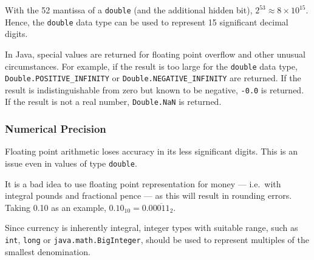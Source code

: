 With the \SI{52}{\bit} mantissa of a \texttt{double} (and the additional hidden bit), \( 2^{53} \approx 8 \times {10}^{15} \).
Hence, the \texttt{double} data type can be used to represent \num{15} significant decimal digits.

In Java, special values are returned for floating point overflow and other unusual circumstances.
For example, if the result is too large for the \texttt{double} data type, \texttt{Double.POSITIVE\_INFINITY} or \texttt{Double.NEGATIVE\_INFINITY} are returned.
If the result is indistinguishable from zero but known to be negative, \texttt{-0.0} is returned.
If the result is not a real number, \texttt{Double.NaN} is returned.

\subsubsection{Numerical Precision}

Floating point arithmetic loses accuracy in its less significant digits.
This is an issue even in values of type \texttt{double}.

It is a bad idea to use floating point representation for money --- i.e.\ with integral pounds and fractional pence --- as this will result in rounding errors.
Taking \SI{0.10}[\text{\textsterling}]{} as an example, \( {0.10}_{10} = {0.0\overline{0011}}_{2} \).

Since currency is inherently integral, integer types with suitable range, such as \texttt{int}, \texttt{long} or \texttt{java.math.BigInteger}, should be used to represent multiples of the smallest denomination.
